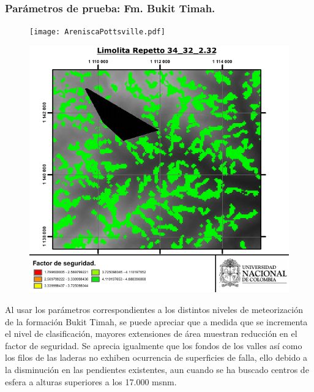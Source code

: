 \subsubsection{Par\'ametros de prueba: Fm. Bukit Timah.}
\begin{figure}[H]
\centering
\begin{minipage}{.45\linewidth}
  \texttt{[image: AreniscaPottsville.pdf]}
  \label{fig:pottsville}
\end{minipage}
\hspace{.05\linewidth}
\begin{minipage}{.45\linewidth}
  \includegraphics[width=\linewidth]{img/LimolitaRepetto34_32_232.pdf}
  \label{fig:repetto}
\end{minipage}
\end{figure}

Al usar los par\'ametros correspondientes a los distintos niveles de meteorizaci\'on de la formaci\'on Bukit Timah, se puede apreciar que a medida que se incrementa el nivel de clasificaci\'on, mayores extensiones de \'area muestran reducci\'on en el factor de seguridad.
Se aprecia igualmente que los fondos de los valles as\'i como los filos de las laderas no exhiben ocurrencia de superficies de falla, ello debido a la disminuci\'on en las pendientes existentes, aun cuando se ha buscado centros de esfera a alturas superiores a los 17.000 msnm.


